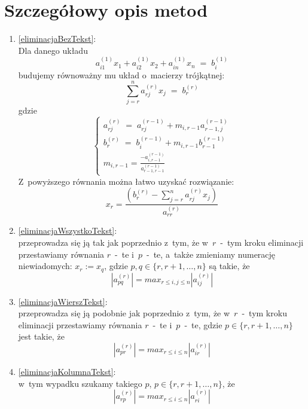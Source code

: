 \documentclass[a4paper]{article}
\begin{document}
\section{Szczegółowy opis metod}
\begin{enumerate}[(1)]
 \item\label{eliminacjaBez} \ref{eliminacjaBezTekst}: \\
Dla danego układu
\[
 a_{i1}^{(1)}x_1 + a_{i2}^{(1)}x_2 + a_{in}^{(1)}x_n\;=\;b_i^{(1)} 
\]
budujemy równoważny mu układ o~macierzy trójkątnej:
\[
 \sum_{j=r}^na_{rj}^{(r)}x_j\;=\;b_r^{(r)} 
\]
gdzie
\[
   \begin{cases}
   a_{rj}^{(r)}\;=\;a_{rj}^{(r-1)} + m_{i,r-1}a_{r-1,j}^{(r-1)} \\
   b_r^{(r)}\;=\;b_i^{(r-1)} + m_{i,r-1}b_{r-1}^{(r-1)}\\
   m_{i,r-1} = \frac {-a_{i,r-1}^{(r-1)}} {a_{r-1,r-1}^{(r-1)}}
  \end{cases}
\]
Z~powyższego równania można łatwo uzyskać rozwiązanie:
\[
 x_r = \frac {\left( b_r^{(r)} - \sum_{j=r}^na_{rj}^{(r)}x_j\right)} {a_{rr}^{(r)}}
\]
 \item\label{eliminacjaWszystko} \ref{eliminacjaWszystkoTekst}:\\
przeprowadza się ją tak jak poprzednio z~tym, że w~$r$~-~tym kroku eliminacji przestawiamy równania $r$~-~te i~$p$~-~te, a~także
zmieniamy numerację niewiadomych: $x_r := x_q$, gdzie $p, q \in \{r, r+1, \dots, n\}$ są takie, że 
\begin{displaymath}
 |a_{pq}^{(r)}| = max_{r\leq i,j \leq n} |a_{ij}^{(r)}|
\end{displaymath}
 \item\label{eliminacjaWiersz} \ref{eliminacjaWierszTekst}: \\
przeprowadza się ją podobnie jak poprzednio z~tym, że w~$r$~-~tym kroku eliminacji przestawiamy równania $r$~-~te i~$p$~-~te, gdzie $p \in \{r, r+1, \dots, n\}$ jest takie, że
\begin{displaymath}
 |a_{pr}^{(r)}| = max_{r\leq i \leq n} |a_{ir}^{(r)}|
\end{displaymath}
 \item\label{eliminacjaKolumna} \ref{eliminacjaKolumnaTekst}: \\
w~tym wypadku szukamy takiego $p$, $p \in \{r, r+1, \dots, n\}$, że
\begin{displaymath}
 |a_{rp}^{(r)}| = max_{r\leq i \leq n} |a_{ri}^{(r)}|
\end{displaymath}
\end{enumerate}
\end{document}

